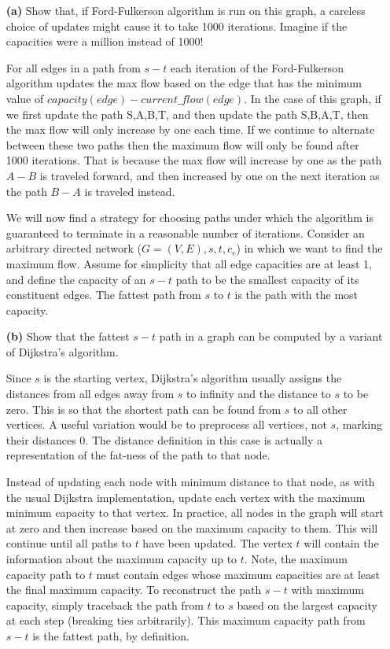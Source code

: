 \documentclass[11pt]{article}
\begin{document}
\begin{itemize}
\item[{\bf (a)}] Show that, if Ford-Fulkerson algorithm is run on this graph, 
  a careless choice of updates might cause it to take 1000 iterations. 
  Imagine if the capacities were a million instead of 1000!

  For all edges in a path from $s - t$ each iteration of the Ford-Fulkerson 
  algorithm updates the max flow based on the edge that has the minimum 
  value of $capacity(edge) - current\_flow(edge)$.  In the case of this graph, if we 
  first update the path S,A,B,T, and then update the path S,B,A,T, then the
  max flow will only increase by one each time. If we continue to alternate between
  these two paths then the maximum flow will only be found after 1000 iterations.
  That is because the max flow
  will increase by one as the path $A-B$ is traveled forward, and then increased
  by one on the next iteration as the path $B- A$ is traveled instead.

   We will now find a strategy for choosing paths under which the algorithm 
   is guaranteed to terminate in a reasonable number of iterations.
   Consider an arbitrary directed network ($G = (V,E),s,t,{c_e}$) in which we 
   want to find the maximum flow. Assume for simplicity that all edge 
   capacities are at least 1, and define the capacity of an $s - t$ path to 
   be the smallest capacity of its constituent edges. 
   The fattest path from $s$ to $t$ is the path with the most capacity.

 \item[{\bf (b)}] Show that the fattest $s - t$ path in a graph can be 
   computed by a variant of Dijkstra's algorithm.

 Since $s$ is the starting vertex, Dijkstra's algorithm usually assigns the 
 distances from all edges away from $s$ to infinity and the distance to $s$ to
 be zero. This is so that the shortest path can be found from $s$ to all other
 vertices. A useful variation would be to preprocess all vertices, not $s$, marking 
 their distances $0$. The distance definition in this case is actually a
 representation of the fat-ness of the path to that node. 

 Instead of updating each node with minimum distance to that node, as with the
 usual Dijkstra implementation, update each vertex with the maximum minimum capacity to that 
 vertex. In practice, all nodes in the graph will start at zero and then increase
 based on the maximum capacity to them. This will continue until all paths to $t$
 have been updated. The vertex $t$ will contain the information about the 
 maximum capacity up to $t$. Note, the maximum capacity path to $t$ must contain
 edges whose maximum capacities are at least the final maximum capacity. 
 To reconstruct the path $s - t$ with maximum 
 capacity, simply traceback the path from $t$ to $s$ based on the largest 
 capacity at each step (breaking ties arbitrarily). This maximum capacity
 path from $s - t$ is the fattest path, by definition. 


\end{itemize}
\end{document}
